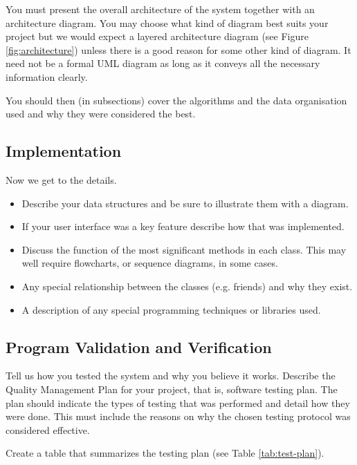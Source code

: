 \documentclass[11pt,a4paper]{article}
\begin{document}
You must present the overall architecture of the system together with
an architecture diagram. You may choose what kind of diagram best
suits your project but we would expect a layered architecture diagram
(see Figure \ref{fig:architecture}) unless there is a good reason for
some other kind of diagram. It need not be a formal UML diagram as
long as it conveys all the necessary information clearly.

You should then (in subsections) cover the algorithms and the data
organisation used and why they were considered the best. 

\subsection{Implementation}

Now we get to the details. 

\begin{itemize}
\item Describe your data structures and be sure to illustrate them
  with a diagram.

\item If your user interface was a key feature describe how that was
  implemented.

\item Discuss the function of the most significant methods in each
  class. This may well require flowcharts, or sequence diagrams, in
  some cases.

\item Any special relationship between the classes (e.g. friends) and
  why they exist.

\item A description of any special programming techniques or libraries
  used.
\end{itemize}

\subsection{Program Validation and Verification}
\label{ss:progr-valid-verif}

Tell us how you tested the system and why you believe it works.
Describe the Quality Management Plan for your project, that is,
software testing plan. The plan should indicate the types of testing
that was performed and detail how they were done. This must include
the reasons on why the chosen testing protocol was considered
effective.

Create a table that summarizes the testing plan (see Table
\ref{tab:test-plan}).
\end{document}
